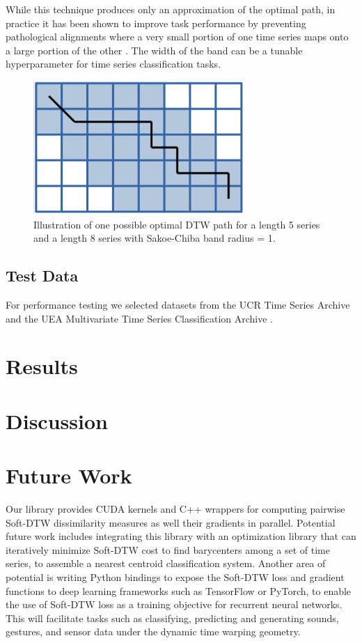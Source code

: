 \documentclass[12pt, letterpaper]{article}
\begin{document}
While this technique produces only an approximation of the optimal path, in
practice it has been shown to improve task performance by preventing
pathological alignments where a very small portion of one time series maps onto
a large portion of the other \cite{keogh_exact_2002}. The width of the band
can be a tunable hyperparameter for time series classification tasks.

\begin{figure}[htbp]
\includegraphics[height=2in]{img/sakoe_chiba.png}
\centering
\caption{Illustration of one possible optimal DTW path for a length 5 series and
a length 8 series with Sakoe-Chiba band radius = 1.}
\label{sakoe_chiba}
\end{figure}


\subsection{Test Data}

For performance testing we selected datasets from the UCR Time Series Archive
\cite{dau_ucr_2019} and the UEA Multivariate Time Series Classification Archive
\cite{bagnall_uea_2018}.

\section{Results}

\section{Discussion}

\section{Future Work}

Our library provides CUDA kernels and C++ wrappers for computing pairwise
Soft-DTW dissimilarity measures as well their gradients in parallel. Potential
future work includes integrating this library with an optimization library that
can iteratively minimize Soft-DTW cost to find barycenters among a set of time
series, to assemble a nearest centroid classification system. Another area of
potential is writing Python bindings to expose the Soft-DTW loss and gradient
functions to deep learning frameworks such as TensorFlow or PyTorch, to enable
the use of Soft-DTW loss as a training objective for recurrent neural networks.
This will facilitate tasks such as classifying, predicting and generating sounds,
gestures, and sensor data under the dynamic time warping geometry.

\printbibliography[]
\end{document}
